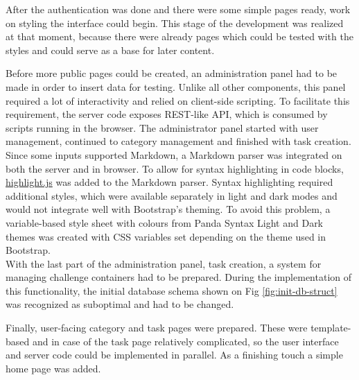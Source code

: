 After the authentication was done and there were some simple pages ready, work on styling the interface could begin. This stage of the development was realized at that moment, because there were already pages which could be tested with the styles and could serve as a base for later content.

Before more public pages could be created, an administration panel had to be made in order to insert data for testing. Unlike all other components, this panel required a lot of interactivity and relied on client-side scripting. To facilitate this requirement, the server code exposes REST-like API, which is consumed by scripts running in the browser. The administrator panel started with user management, continued to category management and finished with task creation.\\
Since some inputs supported Markdown, a Markdown parser was integrated on both the server and in browser. To allow for syntax highlighting in code blocks, \href{https://highlightjs.org}{highlight.js} was added to the Markdown parser. Syntax highlighting required additional styles, which were available separately in light and dark modes and would not integrate well with Bootstrap's theming. To avoid this problem, a variable-based style sheet with colours from Panda Syntax Light and Dark themes was created with CSS variables set depending on the theme used in Bootstrap.\\
With the last part of the administration panel, task creation, a system for managing challenge containers had to be prepared. During the implementation of this functionality, the initial database schema shown on Fig \ref{fig:init-db-struct} was recognized as suboptimal and had to be changed.

Finally, user-facing category and task pages were prepared. These were template-based and in case of the task page relatively complicated, so the user interface and server code could be implemented in parallel. As a finishing touch a simple home page was added.
